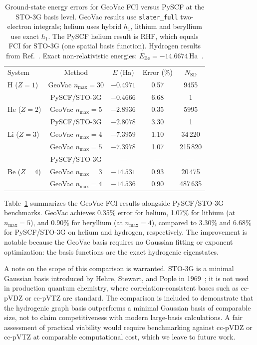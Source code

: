 \documentclass[aps,pra,twocolumn,superscriptaddress,longbibliography,floatfix]{revtex4-2}
\begin{document}
\begin{table}
\caption{\label{tab:comparison}%
Ground-state energy errors for GeoVac FCI versus PySCF at the STO-3G
basis level.
GeoVac results use \texttt{slater\_full} two-electron integrals;
helium uses hybrid $h_1$, lithium and beryllium use exact $h_1$.
The PySCF helium result is RHF, which equals FCI for STO-3G
(one spatial basis function).
Hydrogen results from Ref.~\cite{Loutey2026a}.
Exact non-relativistic energies: $E_{\text{Be}} = -14.6674\,\text{Ha}$~\cite{NIST_ASD}.}
\begin{ruledtabular}
\begin{tabular}{lcccc}
System & Method & $E$ (Ha) & Error (\%) & $N_{\text{SD}}$ \\
\colrule
H ($Z\!=\!1$) & GeoVac $n_{\max}\!=\!30$ & $-0.4971$ & 0.57 & 9455 \\
              & PySCF/STO-3G & $-0.4666$ & 6.68 & 1 \\
\colrule
He ($Z\!=\!2$) & GeoVac $n_{\max}\!=\!5$ & $-2.8936$ & 0.35 & 5995 \\
               & PySCF/STO-3G & $-2.8078$ & 3.30 & 1 \\
\colrule
Li ($Z\!=\!3$) & GeoVac $n_{\max}\!=\!4$ & $-7.3959$ & 1.10 & 34\,220 \\
               & GeoVac $n_{\max}\!=\!5$ & $-7.3978$ & 1.07 & 215\,820 \\
               & PySCF/STO-3G & --- & --- & --- \\
\colrule
Be ($Z\!=\!4$) & GeoVac $n_{\max}\!=\!3$ & $-14.531$ & 0.93 & 20\,475 \\
               & GeoVac $n_{\max}\!=\!4$ & $-14.536$ & 0.90 & 487\,635 \\
\end{tabular}
\end{ruledtabular}
\end{table}

Table~\ref{tab:comparison} summarizes the GeoVac FCI results
alongside PySCF/STO-3G benchmarks.
GeoVac achieves 0.35\% error for helium, 1.07\% for lithium
(at $n_{\max}=5$), and 0.90\% for beryllium (at $n_{\max}=4$),
compared to 3.30\% and 6.68\% for PySCF/STO-3G on helium and
hydrogen, respectively.
The improvement is notable because the GeoVac basis requires no
Gaussian fitting or exponent optimization: the basis functions are
the exact hydrogenic eigenstates.

A note on the scope of this comparison is warranted.  STO-3G is a
minimal Gaussian basis introduced by Hehre, Stewart, and Pople in
1969~\cite{hehre1969}; it is not used in production quantum chemistry,
where correlation-consistent bases such as cc-pVDZ or cc-pVTZ are
standard.  The comparison is included to demonstrate that the
hydrogenic graph basis outperforms a minimal Gaussian basis of
comparable size, not to claim competitiveness with modern
large-basis calculations.  A fair assessment of practical viability
would require benchmarking against cc-pVDZ or cc-pVTZ at comparable
computational cost, which we leave to future work.
\end{document}

